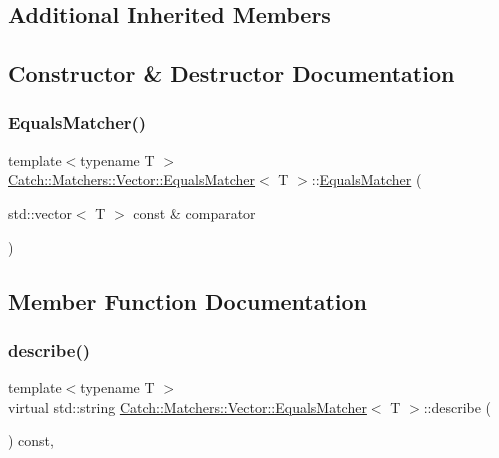 \subsection*{Additional Inherited Members}


\subsection{Constructor \& Destructor Documentation}
\mbox{\label{struct_catch_1_1_matchers_1_1_vector_1_1_equals_matcher_a3846c47780d1991dcfe87aefded98008}} 
\subsubsection{\texorpdfstring{Equals\+Matcher()}{EqualsMatcher()}}
{\footnotesize\ttfamily template$<$typename T $>$ \\
\mbox{\hyperlink{struct_catch_1_1_matchers_1_1_vector_1_1_equals_matcher}{Catch\+::\+Matchers\+::\+Vector\+::\+Equals\+Matcher}}$<$ T $>$\+::\mbox{\hyperlink{struct_catch_1_1_matchers_1_1_vector_1_1_equals_matcher}{Equals\+Matcher}} (\begin{DoxyParamCaption}\item[{std\+::vector$<$ T $>$ const \&}]{comparator }\end{DoxyParamCaption})\hspace{0.3cm}{\ttfamily [inline]}}



\subsection{Member Function Documentation}
\mbox{\label{struct_catch_1_1_matchers_1_1_vector_1_1_equals_matcher_aca79ade26f4a75b2a57005067e086e35}} 
\subsubsection{\texorpdfstring{describe()}{describe()}}
{\footnotesize\ttfamily template$<$typename T $>$ \\
virtual std\+::string \mbox{\hyperlink{struct_catch_1_1_matchers_1_1_vector_1_1_equals_matcher}{Catch\+::\+Matchers\+::\+Vector\+::\+Equals\+Matcher}}$<$ T $>$\+::describe (\begin{DoxyParamCaption}{ }\end{DoxyParamCaption}) const\hspace{0.3cm}{\ttfamily [inline]}, {\ttfamily [virtual]}}



